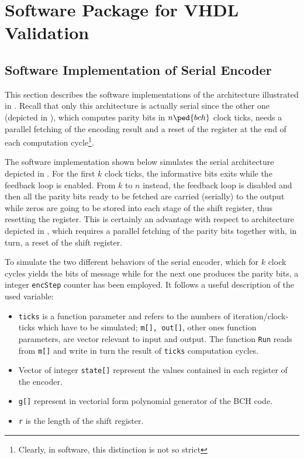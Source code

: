 \chapter{Software Package for VHDL Validation} \label{ch:SWForVDL}


\section{Software Implementation of Serial Encoder}

This section describes the software implementations of the architecture illustrated in . Recall that only this architecture is actually serial since the other one (depicted in ), which computes parity bits in \(n\ped{bch}\) clock ticks, needs a parallel fetching of the encoding result and a reset of the register at the end of each computation cycle\footnote{Clearly, in software, this distinction is not so strict}.

The software implementation shown below simulates the serial architecture depicted in . For the first \(k\) clock ticks, the informative bits exits while the feedback loop is enabled. From \(k\) to \(n\) instead, the feedback loop is disabled and then all the parity bits ready to be fetched are carried (serially) to the output while zeros are going to be stored into each stage of the shift register, thus resetting the register. This is certainly an advantage with respect to architecture depicted in , which requires a parallel fetching of the parity bits together with, in turn, a reset of the shift register.

To simulate the two different behaviors of the serial encoder, which for \(k\) clock cycles yields the bits of message while for the next one produces the parity bits, a integer \texttt{encStep} counter has been employed. It follows a useful description of the used variable:
\begin{itemize}
\item \texttt{ticks} is a function parameter and refers to the numbers of iteration/clock-ticks which have to be simulated; \texttt{m[], out[]}, other ones function parameters, are vector relevant to input and output. The function \texttt{Run} reads from \texttt{m[]} and write in turn the result of \texttt{ticks} computation cycles.
\item Vector of integer \texttt{state[]} represent the values contained in each register of the encoder.
\item \texttt{g[]} represent in vectorial form polynomial generator of the BCH code.
\item \texttt{r} is the length of the shift register.
\end{itemize}

